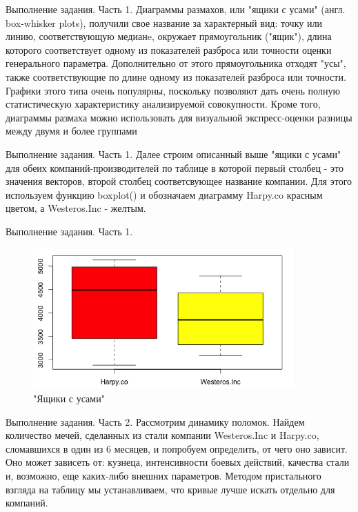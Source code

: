 \documentclass{beamer}
\begin{document}
\begin{frame}{Выполнение задания. Часть 1.}
Диаграммы размахов, или "ящики с усами" (англ. box-whisker plots), получили свое название за характерный вид: точку или линию, соответствующую медианe, окружает прямоугольник ("ящик"), длина которого соответствует одному из показателей разброса или точности оценки генерального параметра. Дополнительно от этого прямоугольника отходят "усы", также соответствующие по длине одному из показателей разброса или точности. Графики этого типа очень популярны, поскольку позволяют дать очень полную статистическую характеристику анализируемой совокупности. Кроме того, диаграммы размаха можно использовать для визуальной экспресс-оценки разницы между двумя и более группами
\end{frame}

\begin{frame}{Выполнение задания. Часть 1.}
Далее строим описанный выше "ящики с усами"  для обеих компаний-производителей по таблице в которой первый столбец - это значения векторов, второй столбец соответсвующее название компании. 
Для этого используем функцию boxplot() и обозначаем диаграмму Harpy.co красным цветом, а Westeros.Inc - желтым.

\end{frame}

\begin{frame}{Выполнение задания. Часть 1.}	
	\begin{figure}[h]
		\includegraphics[width=100mm]{ysi}
		\caption{"Ящики с усами"}
		\label{ysi}
	\end{figure}
\end{frame}

\begin{frame}{Выполнение задания. Часть 2.}
Рассмотрим динамику поломок. 
Найдем количество  мечей, сделанных из стали компании Westeros.Inc и Harpy.co, сломавшихся в один из 6 месяцев, и попробуем определить, от чего оно зависит.
Оно может зависеть от: кузнеца, интенсивности боевых действий, качества стали и, возможно, еще каких-либо внешних параметров.
Методом пристального взгляда на таблицу мы устанавливаем, что кривые лучше искать отдельно для компаний.

\end{frame}
\end{document}
